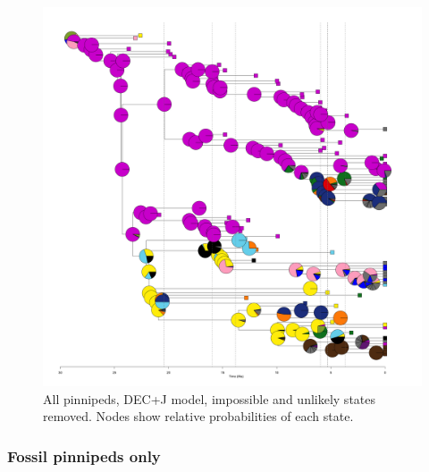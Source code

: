 \documentclass[a4paper, 12pt]{article}
\begin{document}
\begin{figure}[H]
 \centering
  \includegraphics[width = \linewidth]{figures/all-pinnipeds-DECj-unlikely-pies.png}
  \caption{All pinnipeds, DEC+J model, impossible and unlikely states removed. Nodes show relative probabilities of each state.}
  \label{fig-all-decj-pie-unlikely}
\end{figure} 

\subsubsection{Fossil pinnipeds only}
\end{document}

